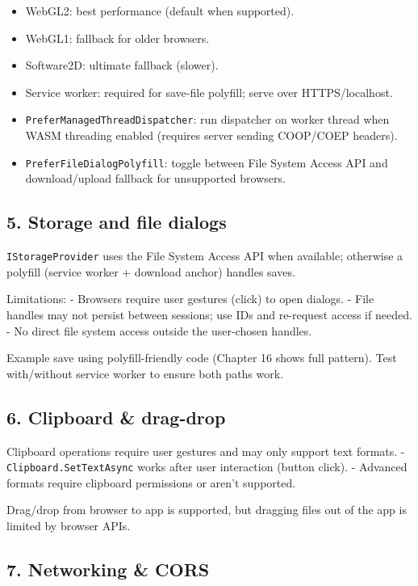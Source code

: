 \begin{itemize}
\tightlist
\item
  WebGL2: best performance (default when supported).
\item
  WebGL1: fallback for older browsers.
\item
  Software2D: ultimate fallback (slower).
\item
  Service worker: required for save-file polyfill; serve over
  HTTPS/localhost.
\item
  \passthrough{\lstinline!PreferManagedThreadDispatcher!}: run
  dispatcher on worker thread when WASM threading enabled (requires
  server sending COOP/COEP headers).
\item
  \passthrough{\lstinline!PreferFileDialogPolyfill!}: toggle between
  File System Access API and download/upload fallback for unsupported
  browsers.
\end{itemize}

\subsection{5. Storage and file dialogs}\label{storage-and-file-dialogs}

\passthrough{\lstinline!IStorageProvider!} uses the File System Access
API when available; otherwise a polyfill (service worker + download
anchor) handles saves.

Limitations: - Browsers require user gestures (click) to open dialogs. -
File handles may not persist between sessions; use IDs and re-request
access if needed. - No direct file system access outside the user-chosen
handles.

Example save using polyfill-friendly code (Chapter 16 shows full
pattern). Test with/without service worker to ensure both paths work.

\subsection{6. Clipboard \& drag-drop}\label{clipboard-drag-drop}

Clipboard operations require user gestures and may only support text
formats. - \passthrough{\lstinline!Clipboard.SetTextAsync!} works after
user interaction (button click). - Advanced formats require clipboard
permissions or aren't supported.

Drag/drop from browser to app is supported, but dragging files out of
the app is limited by browser APIs.

\subsection{7. Networking \& CORS}\label{networking-cors}

